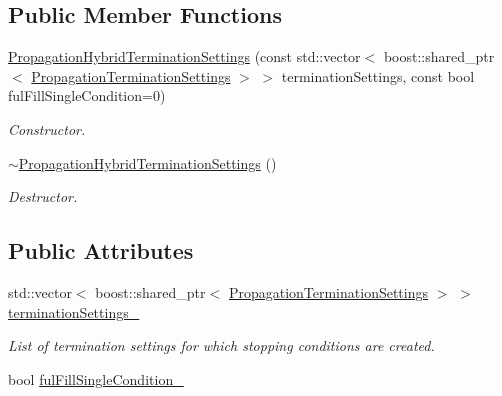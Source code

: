 \subsection*{Public Member Functions}
\begin{DoxyCompactItemize}
\item 
\hyperlink{classtudat_1_1propagators_1_1PropagationHybridTerminationSettings_a107acf00dfdc784ed6708a30b8806a86}{Propagation\+Hybrid\+Termination\+Settings} (const std\+::vector$<$ boost\+::shared\+\_\+ptr$<$ \hyperlink{classtudat_1_1propagators_1_1PropagationTerminationSettings}{Propagation\+Termination\+Settings} $>$ $>$ termination\+Settings, const bool ful\+Fill\+Single\+Condition=0)
\begin{DoxyCompactList}\small\item\em Constructor. \end{DoxyCompactList}\item 
\hyperlink{classtudat_1_1propagators_1_1PropagationHybridTerminationSettings_adab6222cca632f7a5f453a6fcdc23c24}{$\sim$\+Propagation\+Hybrid\+Termination\+Settings} ()\hypertarget{classtudat_1_1propagators_1_1PropagationHybridTerminationSettings_adab6222cca632f7a5f453a6fcdc23c24}{}\label{classtudat_1_1propagators_1_1PropagationHybridTerminationSettings_adab6222cca632f7a5f453a6fcdc23c24}

\begin{DoxyCompactList}\small\item\em Destructor. \end{DoxyCompactList}\end{DoxyCompactItemize}
\subsection*{Public Attributes}
\begin{DoxyCompactItemize}
\item 
std\+::vector$<$ boost\+::shared\+\_\+ptr$<$ \hyperlink{classtudat_1_1propagators_1_1PropagationTerminationSettings}{Propagation\+Termination\+Settings} $>$ $>$ \hyperlink{classtudat_1_1propagators_1_1PropagationHybridTerminationSettings_a85369f8fd9a2334912bd2c0ad485e8b8}{termination\+Settings\+\_\+}\hypertarget{classtudat_1_1propagators_1_1PropagationHybridTerminationSettings_a85369f8fd9a2334912bd2c0ad485e8b8}{}\label{classtudat_1_1propagators_1_1PropagationHybridTerminationSettings_a85369f8fd9a2334912bd2c0ad485e8b8}

\begin{DoxyCompactList}\small\item\em List of termination settings for which stopping conditions are created. \end{DoxyCompactList}\item 
bool \hyperlink{classtudat_1_1propagators_1_1PropagationHybridTerminationSettings_ac73dee77fd30cb5b6adbc1e429de573c}{ful\+Fill\+Single\+Condition\+\_\+}
\end{DoxyCompactItemize}


